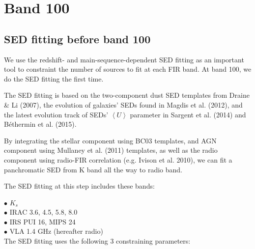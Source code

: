 \documentclass[11pt,a4paper]{article}
\begin{document}

\clearpage

\section{Band 100}

\subsection{SED fitting before band 100}
\label{Band100_Galsed}

We use the redshift- and main-sequence-dependent SED fitting as an important tool to constraint the number of sources to fit at each FIR band. At band 100, we do the SED fitting the first time. 

The SED fitting is based on the two-component dust SED templates from Draine \& Li (2007), the evolution of galaxies' SEDs found in Magdis et al. (2012), and the latest evolution track of SEDs' $\left<U\right>$ parameter in Sargent et al. (2014) and B\'{e}thermin et al. (2015). 

By integrating the stellar component using BC03 templates, and AGN component using Mullaney et al. (2011) templates, as well as the radio component using radio-FIR correlation (e.g. Ivison et al. 2010), we can fit a panchromatic SED from K band all the way to radio band. 

The SED fitting at this step includes these bands: 

\indent\hspace{15pt}$\bullet$ $K_s$
\\
\indent\hspace{15pt}$\bullet$ IRAC 3.6, 4.5, 5.8, 8.0
\\
\indent\hspace{15pt}$\bullet$ IRS PUI 16, MIPS 24
\\
\indent\hspace{15pt}$\bullet$ VLA 1.4 GHz (hereafter radio) 
\\

The SED fitting uses the following 3 constraining parameters: 
\end{document}
